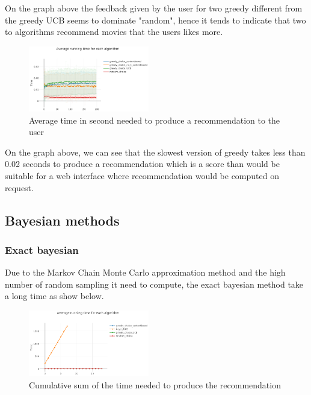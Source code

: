 \documentclass[letterpaper]{article}
\begin{document}
On the graph above the feedback given by the user for two greedy different from the greedy UCB seems to dominate "random", hence it tends to indicate that two to algorithms recommend movies that the users likes more.

\begin{figure}[H]
\begin{center}
\includegraphics[width=0.47\textwidth]{img/greedy3.png}
\caption{Average time in second needed to produce a recommendation to the user}
\label{greedy3}
\end{center}
\end{figure}

On the graph above, we can see that the slowest version of greedy takes less than 0.02 seconds to produce a recommendation which is a score than would be suitable for a web interface where recommendation would be computed on request.


\subsection{Bayesian methods}

\subsubsection{Exact bayesian}

Due to the Markov Chain Monte Carlo approximation method and the high number of random sampling it need to compute, the exact bayesian method take a long time as show below.

\begin{figure}[H]
\begin{center}
\includegraphics[width=0.47\textwidth]{img/bayes_time1.png}
\caption{Cumulative sum of the time needed to produce the recommendation}
\label{bayes_time1}
\end{center}
\end{figure}
\end{document}
